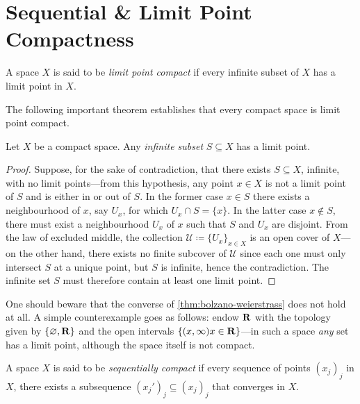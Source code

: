 \section{Sequential \& Limit Point Compactness}

\begin{definition}
\label{def:limit-point-compact}
A space \(X\) is said to be \emph{limit point compact} if every infinite subset
of \(X\) has a limit point in \(X\).
\end{definition}

The following important theorem establishes that every compact space is limit
point compact.

\begin{theorem}
\label{thm:bolzano-weierstrass}
Let \(X\) be a compact space. Any \emph{infinite subset} \(S \subseteq X\) has a
limit point.
\end{theorem}

\begin{proof}
Suppose, for the sake of contradiction, that there exists \(S \subseteq X\),
infinite, with no limit points---from this hypothesis, any point \(x \in X\)
is not a limit point of \(S\) and is either in or out of \(S\). In the former
case \(x \in S\) there exists a neighbourhood of \(x\), say \(U_x\), for which
\(U_x \cap S = \{x\}\). In the latter case \(x \notin S\), there must exist a
neighbourhood \(U_x\) of \(x\) such that \(S\) and \(U_x\) are disjoint. From
the law of excluded middle, the collection
\(\mathcal{U} \coloneq \{U_x\}_{x \in X}\) is an open cover of \(X\)---on the
other hand, there exists no finite subcover of \(\mathcal{U}\) since each one
must only intersect \(S\) at a unique point, but \(S\) is infinite, hence the
contradiction. The infinite set \(S\) must therefore contain at least one limit
point.
\end{proof}

\begin{remark}
\label{rem:bolzano-weierstrass}
One should beware that the converse of \cref{thm:bolzano-weierstrass} does not
hold at all. A simple counterexample goes as follows: endow \(\mathbf{R}\) with the
topology given by \(\{\varnothing, \mathbf{R}\}\) and the open intervals
\(\{(x, \infty) \relax x \in \mathbf{R}\}\)---in such a space \emph{any} set has a
limit point, although the space itself is not compact.
\end{remark}

\begin{definition}
\label{def:sequentially-compact}
A space \(X\) is said to be \emph{sequentially compact} if every
sequence of points \((x_j)_j\) in \(X\), there exists a subsequence \((x_j')_j
\subseteq (x_j)_j\) that converges in \(X\).
\end{definition}

